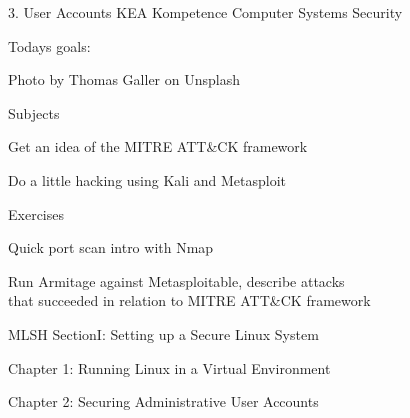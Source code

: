 \documentclass[Screen16to9,17pt]{foils}
\begin{document}
\mytitlepage
{3. User Accounts}
{KEA Kompetence Computer Systems Security \the\year}




Todays goals:
\begin{list2}
\item
\end{list2}

  Photo by Thomas Galler on Unsplash


\begin{list1}
\item Subjects
\begin{list2}
\item Get an idea of the MITRE ATT\&CK framework
\item Do a little hacking using Kali and Metasploit
\end{list2}
\item Exercises
\begin{list2}
\item Quick port scan intro with Nmap
\item Run Armitage against Metasploitable, describe attacks\\
that succeeded in relation to MITRE ATT\&CK framework
\end{list2}
\end{list1}




MLSH SectionI: Setting up a Secure Linux System
\begin{list1}
\item Chapter 1: Running Linux in a Virtual Environment
\item Chapter 2: Securing Administrative User Accounts

\end{list1}


\slidenext
\end{document}
